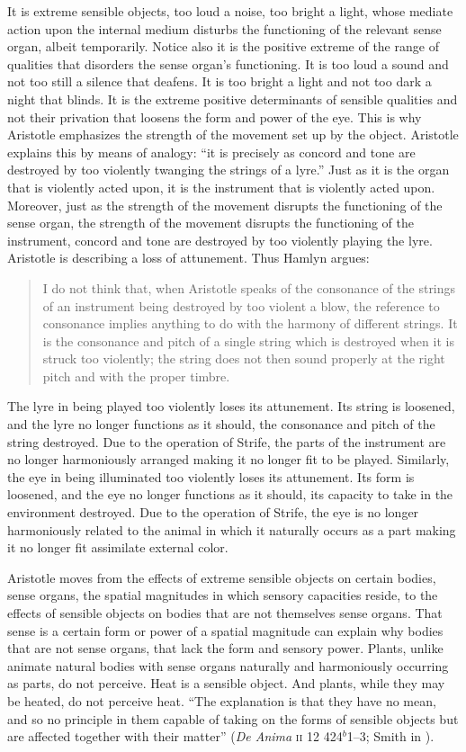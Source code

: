 It is extreme sensible objects, too loud a noise, too bright a light, whose mediate action upon the internal medium disturbs the functioning of the relevant sense organ, albeit temporarily. Notice also it is the positive extreme of the range of qualities that disorders the sense organ's functioning. It is too loud a sound and not too still a silence that deafens. It is too bright a light and not too dark a night that blinds. It is the extreme positive determinants of sensible qualities and not their privation that loosens the form and power of the eye. This is why Aristotle emphasizes the strength of the movement set up by the object. Aristotle explains this by means of analogy: ``it is precisely as concord and tone are destroyed by too violently twanging the strings of a lyre.'' Just as it is the organ that is violently acted upon, it is the instrument that is violently acted upon. Moreover, just as the strength of the movement disrupts the functioning of the sense organ, the strength of the movement disrupts the functioning of the instrument, concord and tone are destroyed by too violently playing the lyre. Aristotle is describing a loss of attunement. Thus Hamlyn argues:
\begin{quote}
	I do not think that, when Aristotle speaks of the consonance of the strings of an instrument being destroyed by too violent a blow, the reference to consonance implies anything to do with the harmony of different strings. It is the consonance and pitch of a single string which is destroyed when it is struck too violently; the string does not then sound properly at the right pitch and with the proper timbre. \citep[114]{Hamlyn:2002ys}
\end{quote}
The lyre in being played too violently loses its attunement. Its string is loosened, and the lyre no longer functions as it should, the consonance and pitch of the string destroyed. Due to the operation of Strife, the parts of the instrument are no longer harmoniously arranged making it no longer fit to be played. Similarly, the eye in being illuminated too violently loses its attunement. Its form is loosened, and the eye no longer functions as it should, its capacity to take in the environment destroyed. Due to the operation of Strife, the eye is no longer harmoniously related to the animal in which it naturally occurs as a part making it no longer fit assimilate external color. 

Aristotle moves from the effects of extreme sensible objects on certain bodies, sense organs, the spatial magnitudes in which sensory capacities reside, to the effects of sensible objects on bodies that are not themselves sense organs. That sense is a certain form or power of a spatial magnitude can explain why bodies that are not sense organs, that lack the form and sensory power. Plants, unlike animate natural bodies with sense organs naturally and harmoniously occurring as parts, do not perceive. Heat is a sensible object. And plants, while they may be heated, do not perceive heat. ``The explanation is that they have no mean, and so no principle in them capable of taking on the forms of sensible objects but are affected together with their matter'' (\emph{De Anima} \textsc{ii} 12 424\( ^{b} \)1--3; Smith in \citealt[43]{Barnes:1984uq}). 

